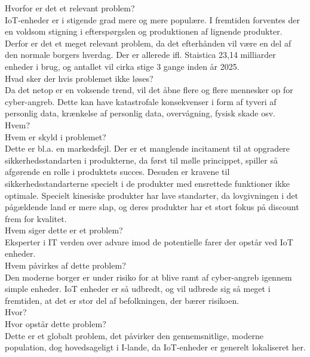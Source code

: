         Hvorfor er det et relevant problem? \\
        IoT-enheder er i stigende grad mere og mere populære. I fremtiden forventes der en voldsom stigning i efterspørgslen og produktionen af lignende produkter. Derfor er det et meget relevant problem, da det efterhånden vil være en del af den normale borgers hverdag. Der er allerede ifl. Staistica 23,14 milliarder enheder i brug, og antallet vil cirka stige 3 gange inden år 2025.\\
        
        Hvad sker der hvis problemet ikke løses?\\
        Da det netop er en voksende trend, vil det åbne flere og flere mennesker op for cyber-angreb. Dette kan have katastrofale konsekvenser i form af tyveri af personlig data, krænkelse af personlig data, overvågning, fysisk skade osv.\\ 
        
        Hvem?\\
        Hvem er skyld i problemet?\\
        Dette er bl.a. en markedsfejl. Der er et manglende incitament til at opgradere sikkerhedsstandarten i produkterne, da først til mølle princippet, spiller så afgørende en rolle i produktets succes. Desuden er kravene til sikkerhedsstandarterne specielt i de produkter med ensrettede funktioner ikke optimale. Specielt kinesiske produkter har lave standarter, da lovgivningen i det pågældende land er mere slap, og deres produkter har et stort fokus på discount frem for kvalitet.\\
        
        
        Hvem siger dette er et problem?\\
        Eksperter i IT verden over advare imod de potentielle farer der opstår ved IoT enheder.\autocite{Rainie2017}\\
        Hvem påvirkes af dette problem?\\
        Den moderne borger er under risiko for at blive ramt af cyber-angreb igennem simple enheder. IoT enheder er så udbredt, og vil udbrede sig så meget i fremtiden, at det er stor del af befolkningen, der bærer risikoen.\\
        
        Hvor?\\
        Hvor opstår dette problem?\\
        Dette er et globalt problem, det påvirker den gennemsnitlige, moderne population, dog hovedsageligt i I-lande, da IoT-enheder er generelt lokaliseret her.\\
        
